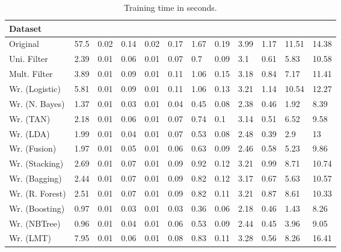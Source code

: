 \documentclass[a4paper,11pt]{article}
\begin{document}
\begin{table}[h]
\centering
\begin{tabular}{||l|l|l|l|l|l|l|l|l|l|l|l||}
	\hline
	Dataset &
	\rotatebox[origin=c]{90}{Logistic} &
	\rotatebox[origin=c]{90}{Naive Bayes} &
	\rotatebox[origin=c]{90}{TAN} &
	\rotatebox[origin=c]{90}{LDA} &
	\rotatebox[origin=c]{90}{Fusion} &
	\rotatebox[origin=c]{90}{Stacking} &
	\rotatebox[origin=c]{90}{Bagging} &
	\rotatebox[origin=c]{90}{Random Forest} &
	\rotatebox[origin=c]{90}{Boosting} &
	\rotatebox[origin=c]{90}{NBTree} &
	\rotatebox[origin=c]{90}{LMT}\\
	\hline 
	Original & 57.5 & 0.02 & 0.14 & 0.02 & 0.17 & 1.67 & 0.19 & 3.99 & 1.17 & 11.51 & 14.38\\
	Uni. Filter & 2.39 & 0.01 & 0.06 & 0.01 & 0.07 & 0.7 & 0.09 & 3.1 & 0.61 & 5.83 & 10.58\\
	Mult. Filter & 3.89 & 0.01 & 0.09 & 0.01 & 0.11 & 1.06 & 0.15 & 3.18 & 0.84 & 7.17 & 11.41\\
	Wr. (Logistic) & 5.81 & 0.01 & 0.09 & 0.01 & 0.11 & 1.06 & 0.13 & 3.21 & 1.14 & 10.54 & 12.27\\
	Wr. (N. Bayes) & 1.37 & 0.01 & 0.03 & 0.01 & 0.04 & 0.45 & 0.08 & 2.38 & 0.46 & 1.92 & 8.39\\
	Wr. (TAN) & 2.18 & 0.01 & 0.06 & 0.01 & 0.07 & 0.74 & 0.1 & 3.14 & 0.51 & 6.52 & 9.58\\
	Wr. (LDA) & 1.99 & 0.01 & 0.04 & 0.01 & 0.07 & 0.53 & 0.08 & 2.48 & 0.39 & 2.9 & 13\\
	Wr. (Fusion) & 1.97 & 0.01 & 0.05 & 0.01 & 0.06 & 0.63 & 0.09 & 2.46 & 0.58 & 5.23 & 9.86\\
	Wr. (Stacking) & 2.69 & 0.01 & 0.07 & 0.01 & 0.09 & 0.92 & 0.12 & 3.21 & 0.99 & 8.71 & 10.74\\
	Wr. (Bagging) & 2.44 & 0.01 & 0.07 & 0.01 & 0.09 & 0.82 & 0.12 & 3.17 & 0.67 & 5.63 & 10.57\\
	Wr. (R. Forest) & 2.51 & 0.01 & 0.07 & 0.01 & 0.09 & 0.82 & 0.11 & 3.21 & 0.87 & 8.61 & 10.33\\
	Wr. (Boosting) & 0.97 & 0.01 & 0.03 & 0.01 & 0.03 & 0.36 & 0.06 & 2.18 & 0.46 & 1.43 & 8.26\\
	Wr. (NBTree) & 0.96 & 0.01 & 0.04 & 0.01 & 0.06 & 0.53 & 0.09 & 2.44 & 0.45 & 3.96 & 9.05\\
	Wr. (LMT) & 7.95 & 0.01 & 0.06 & 0.01 & 0.08 & 0.83 & 0.11 & 3.28 & 0.56 & 8.26 & 16.41\\
    \hline 
\end{tabular}
\caption{Training time in seconds.}
\label{tab:table7}
\end{table}
\end{document}
